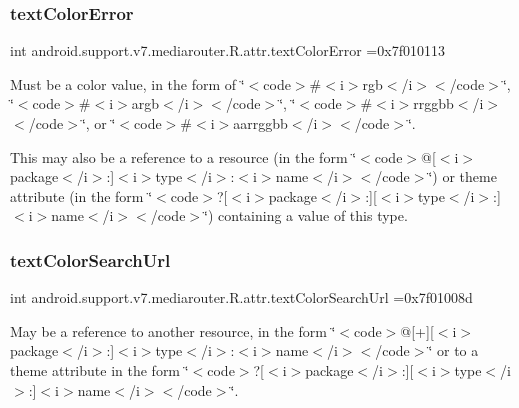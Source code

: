 \subsubsection{\texorpdfstring{text\+Color\+Error}{textColorError}}
{\footnotesize\ttfamily int android.\+support.\+v7.\+mediarouter.\+R.\+attr.\+text\+Color\+Error =0x7f010113\hspace{0.3cm}{\ttfamily [static]}}

Must be a color value, in the form of \char`\"{}$<$code$>$\#$<$i$>$rgb$<$/i$>$$<$/code$>$\char`\"{}, \char`\"{}$<$code$>$\#$<$i$>$argb$<$/i$>$$<$/code$>$\char`\"{}, \char`\"{}$<$code$>$\#$<$i$>$rrggbb$<$/i$>$$<$/code$>$\char`\"{}, or \char`\"{}$<$code$>$\#$<$i$>$aarrggbb$<$/i$>$$<$/code$>$\char`\"{}. 

This may also be a reference to a resource (in the form \char`\"{}$<$code$>$@\mbox{[}$<$i$>$package$<$/i$>$\+:\mbox{]}$<$i$>$type$<$/i$>$\+:$<$i$>$name$<$/i$>$$<$/code$>$\char`\"{}) or theme attribute (in the form \char`\"{}$<$code$>$?\mbox{[}$<$i$>$package$<$/i$>$\+:\mbox{]}\mbox{[}$<$i$>$type$<$/i$>$\+:\mbox{]}$<$i$>$name$<$/i$>$$<$/code$>$\char`\"{}) containing a value of this type. \mbox{\label{classandroid_1_1support_1_1v7_1_1mediarouter_1_1R_1_1attr_a45a88a7030b0e2d50130e12bff42e368}} 
\subsubsection{\texorpdfstring{text\+Color\+Search\+Url}{textColorSearchUrl}}
{\footnotesize\ttfamily int android.\+support.\+v7.\+mediarouter.\+R.\+attr.\+text\+Color\+Search\+Url =0x7f01008d\hspace{0.3cm}{\ttfamily [static]}}

May be a reference to another resource, in the form \char`\"{}$<$code$>$@\mbox{[}+\mbox{]}\mbox{[}$<$i$>$package$<$/i$>$\+:\mbox{]}$<$i$>$type$<$/i$>$\+:$<$i$>$name$<$/i$>$$<$/code$>$\char`\"{} or to a theme attribute in the form \char`\"{}$<$code$>$?\mbox{[}$<$i$>$package$<$/i$>$\+:\mbox{]}\mbox{[}$<$i$>$type$<$/i$>$\+:\mbox{]}$<$i$>$name$<$/i$>$$<$/code$>$\char`\"{}. 

